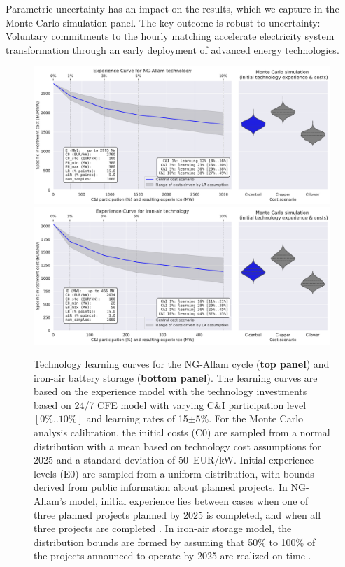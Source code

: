 \documentclass[pdflatex,sn-basic, Numbered]{sn-jnl}%
\theoremstyle{thmstyleone}%
\theoremstyle{thmstyletwo}%
\theoremstyle{thmstylethree}%
\begin{document}
Parametric uncertainty has an impact on the results, which we capture in the Monte Carlo simulation panel. The key outcome is robust to uncertainty: Voluntary commitments to the hourly matching accelerate electricity system transformation through an early deployment of advanced energy technologies. \\


\begin{figure}[htbp]
    \centering
    \includegraphics[width=\textwidth]{images/e_curve_NG-Allam.pdf}
    \includegraphics[width=\textwidth]{images/e_curve_iron-air.pdf}
    \caption{Technology learning curves for the NG-Allam cycle (\textbf{top panel}) and iron-air battery storage (\textbf{bottom panel}).
    The learning curves are based on the experience model with the technology investments based on 24/7 CFE model with varying C\&I participation level $[0\%..10\%]$ and learning rates of 15$\pm$5\%.
    For the Monte Carlo analysis calibration, the initial costs (C0) are sampled from a normal distribution with a mean based on technology cost assumptions for 2025 and a standard deviation of 50~EUR/kW. Initial experience levels (E0) are sampled from a uniform distribution, with bounds derived from public information about planned projects. In NG-Allam's model, initial experience lies between cases when one of three planned projects planned by 2025 is completed, and when all three projects are completed \cite{BroadwingEnergyProject, CoyoteCleanPower, FrogLakeProject}. In iron-air storage model, the distribution bounds are formed by assuming that 50\% to 100\% of the projects announced to operate by 2025 are realized on time \cite{FormEnergyLatest2024}.
    }
    \label{fig:panels}
\end{figure}
\end{document}
